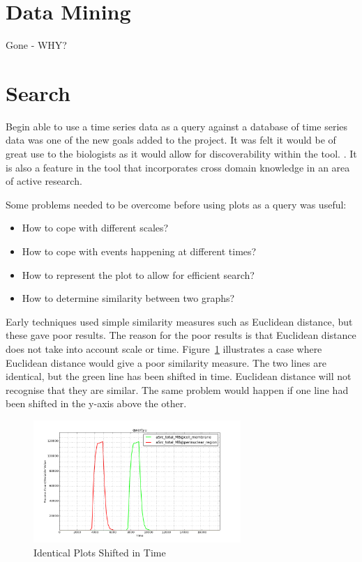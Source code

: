 \section{Data Mining}

Gone - WHY?

\section{Search}

Begin able to use a time series data as a query against a database of time series data was one of the new goals added to the project.  It was felt it would be of great use to the biologists as it would allow for discoverability within the tool. .  It is also a feature in the tool that incorporates cross domain knowledge in an area of active research.

Some problems needed to be overcome before using plots as a query was useful:
\begin{itemize}
\item How to cope with different scales?
\item How to cope with events happening at different times?
\item How to represent the plot to allow for efficient search?
\item How to determine similarity between two graphs?
\end{itemize}

Early techniques used simple similarity measures such as Euclidean distance, but these gave poor results.  The reason for the poor results is that Euclidean distance does not take into account scale or time.  Figure~\ref{fig:similar} illustrates a case where Euclidean distance would give a poor similarity measure.  The two lines are identical, but the green line has been shifted in time.  Euclidean distance will not recognise that they are similar.  The same problem would happen if one line had been shifted in the y-axis above the other.

\begin{figure}[h!]
    \centering
    \includegraphics[width=0.7\textwidth]{images/similar_plots.png}
    \caption{Identical Plots Shifted in Time}
    \label{fig:similar}
\end{figure}

